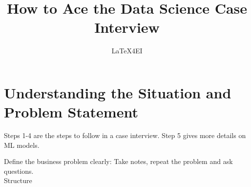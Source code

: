 \documentclass[english]{latex4ei/latex4ei_sheet}
\title{How to Ace the Data Science Case Interview }
\author{LaTeX4EI}					%
\begin{document}
\ifdefined\GitRevision{}\fi

\maketitle   %


\section{Understanding the Situation and Problem Statement}
\begin{sectionbox}
\begin{symbolbox}
Steps 1-4 are the steps to follow in a case interview. Step 5 gives more details on ML models.
\end{symbolbox}
    Define the business problem clearly: Take notes, repeat the problem and ask questions.\\
    Structure 
\end{sectionbox}
\end{document}
